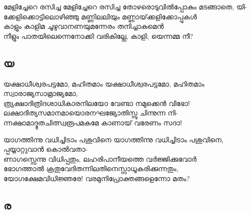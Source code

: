 \begin{enumerate}

\begin{slokam}{\VSv}{\RV}{മേളിച്ചേറെ രസിച്ച}
മേളിച്ചേറെ രസിച്ച തോഴരൊടുവിൽപ്പോകും മടങ്ങാതെ, യി-\\
ക്കേളിക്കൊട്ടിലൊഴിഞ്ഞു മണ്ണിലലിയും മണ്ണായ്‌ക്കളിക്കോപ്പുകള്‍\\
കാളും കാളിമ ചൂഴുവാനണയുമന്നേരം തനിച്ചാകുമെൻ\\
നീളും പാതയിലെന്നെനോക്കി വരികില്ലേ, കാളി, യെന്നമ്മ നീ? 
\end{slokam}


\end{enumerate}


\subsection{യ}

\begin{enumerate}

\begin{slokam}{\VSv}{\VNM}{യക്ഷാധീശ്വരപട്ടമോ, മഹിതമാം}
യക്ഷാധീശ്വരപട്ടമോ, മഹിതമാം സ്വാരാജ്യസാമ്രാജ്യമോ,\\
ത്ര്യക്ഷാദിത്രിദശാധികാരനിലയോ വേണ്ടാ നമുക്കെൻ വിഭോ!\\
ലക്ഷാദിത്യസമാനമായൊരനഘജ്യോതിസ്സു ചിന്നുന്ന നി-\\
ന്നക്ഷാമാദ്ഭുതചിത്സ്വരൂപമകമേ കാണായ്‌ വരേണം സദാ!
\end{slokam}


\begin{slokam}{\VSv}{\YK}{യാഗത്തിന്നു വധിച്ചിടാം പശുവിനെ}
യാഗത്തിന്നു വധിച്ചിടാം പശുവിനെ, പ്പയ്യാറ്റുവാൻ കൊൽവതാ-\\
ണാഗസ്സെന്നു വിധിപ്പതും, ലഹരിപാനീയത്തെ വർജ്ജിക്കുവോർ\\
ഭോഗത്താൽ ക്രതുവേദിതന്നിലതിനെസ്സാധൂകരിക്കുന്നതും,\\
യോഗക്ഷേമവിധിജ്ഞരേ! വരമുനിപ്രോക്തങ്ങളെന്നോ മതം?
\end{slokam}




\end{enumerate}


\subsection{ര}

